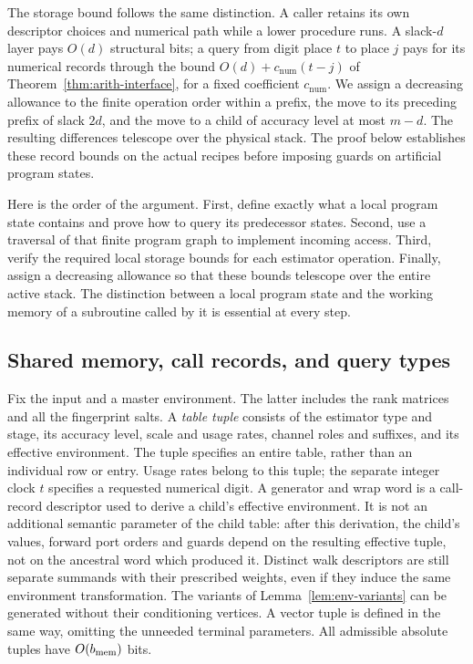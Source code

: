 \documentclass[11pt]{article}
\numberwithin{equation}{section}
\theoremstyle{definition}
\theoremstyle{remark}
\begin{document}
The storage bound follows the same distinction.  A caller retains its
own descriptor choices and numerical path while a lower procedure runs.
A slack-$d$ layer pays $O(d)$ structural bits; a query from digit place
$t$ to place $j$ pays for its numerical records through the bound
$O(d)+c_{\mathrm{num}}(t-j)$ of Theorem~\ref{thm:arith-interface}, for a
fixed coefficient $c_{\mathrm{num}}$.  We assign a decreasing
allowance to the finite operation order within a prefix, the move to its
preceding prefix of slack $2d$, and the move to a child of accuracy level at most
${m}-d$.  The resulting differences telescope over the physical stack.
The proof below establishes these record bounds on the actual recipes before imposing guards on artificial program states.

Here is the order of the argument. First, define exactly what a local program state contains and prove how to query its predecessor states. Second, use a traversal of that finite program graph to implement incoming access. Third, verify the required local storage bounds for each estimator operation. Finally, assign a decreasing allowance so that these bounds telescope over the entire active stack. The distinction between a local program state and the working memory of a subroutine called by it is essential at every step.

\subsection{Shared memory, call records, and query types}\label{sec:ctrl-model}

Fix the input and a master environment.  The latter includes the rank
matrices and all the fingerprint salts.  A \emph{table tuple} consists of
the estimator type and stage, its accuracy level, scale and usage
rates, channel roles and suffixes, and its effective environment.  The
tuple specifies an entire table, rather than an individual row or entry.
Usage rates belong to this tuple; the separate integer clock $t$
specifies a requested numerical digit.
A generator and wrap word is a call-record descriptor used to derive a
child's effective environment.  It is not an additional semantic
parameter of the child table: after this derivation, the child's values,
forward port orders and guards depend on the resulting effective tuple,
not on the ancestral word which produced it.  Distinct walk descriptors
are still separate summands with their prescribed weights, even if they
induce the same environment transformation.  The variants of
Lemma~\ref{lem:env-variants} can be generated without their conditioning
vertices.  A vector tuple is defined in the same way, omitting the
unneeded terminal parameters.  All admissible absolute tuples have
$O({b_{\rm mem}})$ bits.
\end{document}
